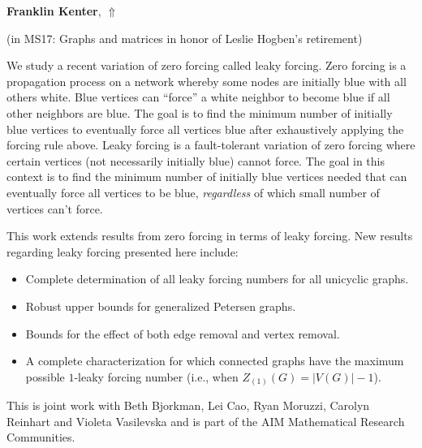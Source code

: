 \documentclass[ILAS2025-program.tex]{subfiles}
\begin{document}
     \hypertarget{down0378}{}\begin{ilasabstract}
    
    \textbf{Franklin Kenter},  \hfill \hyperlink{up0378}{$\Uparrow$}
    
    (in {\color{mstitle}MS17: Graphs and matrices in honor of Leslie Hogben's retirement})
        
        \mtskip
    We study a recent variation of zero forcing called leaky forcing.  Zero forcing is a propagation process on a network whereby some nodes are initially blue with all others white. Blue vertices can ``force'' a white neighbor to become blue if all other  neighbors are blue. The goal is to find the minimum number of initially blue vertices to eventually force all vertices blue after exhaustively applying the forcing rule above.
Leaky forcing is a fault-tolerant variation of zero forcing where certain vertices (not necessarily initially blue) cannot force. The goal in this context is to find the minimum number of initially blue vertices needed that can eventually force all vertices to be blue, {\it regardless} of which small number of vertices can't force.

This work extends results from zero forcing in terms of leaky forcing. New results regarding leaky forcing presented here include:
\begin{itemize}
\item Complete determination of all leaky forcing numbers for all unicyclic graphs.
\item Robust upper bounds for generalized Petersen graphs.
\item Bounds for the effect of both edge removal and vertex removal.
\item A complete characterization for which connected graphs have the maximum possible $1$-leaky forcing number (i.e., when $Z_{(1)}(G) = |V(G)|-1$).
\end{itemize}

This is joint work with 
Beth Bjorkman, Lei Cao, Ryan Moruzzi, Carolyn Reinhart and Violeta Vasilevska and is part of the AIM Mathematical Research Communities. 
\end{ilasabstract}
\end{document}
